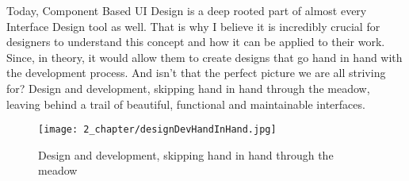 Today, Component Based UI Design is a deep rooted part of almost every Interface Design tool as
well. That is why I believe it is incredibly crucial for designers to understand this concept and
how it can be applied to their work. Since, in theory, it would allow them to create designs that go
hand in hand with the development process. And isn't that the perfect picture we are all striving
for? Design and development, skipping hand in hand through the meadow, leaving behind a trail of
beautiful, functional and maintainable interfaces.

\begin{figure}[]
    \begin{center}
        \texttt{[image: 2\_chapter/designDevHandInHand.jpg]}
        \caption[Caption (url)]{Design and development, skipping hand in hand through the meadow}
    \end{center}
\end{figure}

